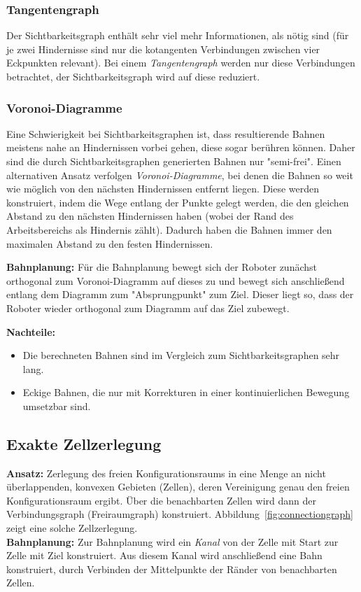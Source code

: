 			\subsubsection{Tangentengraph}
				Der Sichtbarkeitsgraph enthält sehr viel mehr Informationen, als nötig sind (für je zwei Hindernisse sind nur die kotangenten Verbindungen zwischen vier Eckpunkten relevant). Bei einem \emph{Tangentengraph} werden nur diese Verbindungen betrachtet, \dh der Sichtbarkeitsgraph wird auf diese reduziert.

			\subsubsection{Voronoi-Diagramme}
				Eine Schwierigkeit bei Sichtbarkeitsgraphen ist, dass resultierende Bahnen meistens nahe an Hindernissen vorbei gehen, diese sogar berühren können. Daher sind die durch Sichtbarkeitsgraphen generierten Bahnen nur "semi-frei". Einen alternativen Ansatz verfolgen \emph{Voronoi-Diagramme}, bei denen die Bahnen so weit wie möglich von den nächsten Hindernissen entfernt liegen. Diese werden konstruiert, indem die Wege entlang der Punkte gelegt werden, die den gleichen Abstand zu den nächsten Hindernissen haben (wobei der Rand des Arbeitsbereichs als Hindernis zählt). Dadurch haben die Bahnen immer den maximalen Abstand zu den festen Hindernissen.

				\textbf{Bahnplanung:} Für die Bahnplanung bewegt sich der Roboter zunächst orthogonal zum Voronoi-Diagramm auf dieses zu und bewegt sich anschließend entlang dem Diagramm zum "Absprungpunkt" zum Ziel. Dieser liegt so, dass der Roboter wieder orthogonal zum Diagramm auf das Ziel zubewegt.

				\textbf{Nachteile:}
				\begin{itemize}
					\item Die berechneten Bahnen sind im Vergleich zum Sichtbarkeitsgraphen sehr lang.
					\item Eckige Bahnen, die nur mit Korrekturen in einer kontinuierlichen Bewegung umsetzbar sind.
				\end{itemize}

		\subsection{Exakte Zellzerlegung}
			\textbf{Ansatz:} Zerlegung des freien Konfigurationsraums in eine Menge an nicht überlappenden, konvexen Gebieten (Zellen), deren Vereinigung genau den freien Konfigurationsraum ergibt. Über die benachbarten Zellen wird dann der Verbindungsgraph (Freiraumgraph) konstruiert. Abbildung~\ref{fig:connectiongraph} zeigt eine solche Zellzerlegung. \\
			\textbf{Bahnplanung:} Zur Bahnplanung wird ein \emph{Kanal} von der Zelle mit Start zur Zelle mit Ziel konstruiert. Aus diesem Kanal wird anschließend eine Bahn konstruiert, \bspw durch Verbinden der Mittelpunkte der Ränder von benachbarten Zellen.

